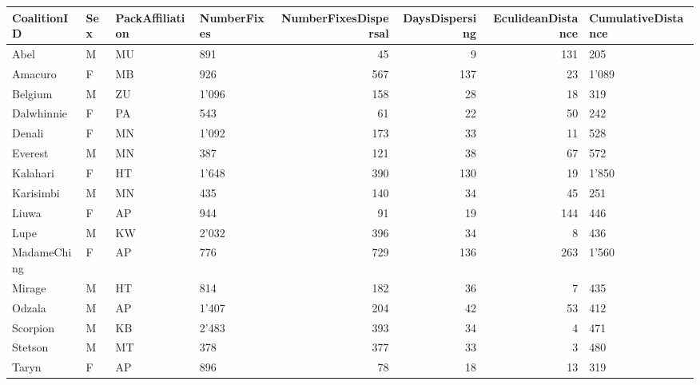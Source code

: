 \begin{tabular}{llllrrrl}
  \toprule
CoalitionID & Sex & PackAffiliation & NumberFixes & NumberFixesDispersal & DaysDispersing & EculideanDistance & CumulativeDistance \\ 
  \midrule
Abel & M & MU & 891 & 45 & 9 & 131 & 205 \\ 
  Amacuro & F & MB & 926 & 567 & 137 & 23 & 1'089 \\ 
  Belgium & M & ZU & 1'096 & 158 & 28 & 18 & 319 \\ 
  Dalwhinnie & F & PA & 543 & 61 & 22 & 50 & 242 \\ 
  Denali & F & MN & 1'092 & 173 & 33 & 11 & 528 \\ 
  Everest & M & MN & 387 & 121 & 38 & 67 & 572 \\ 
  Kalahari & F & HT & 1'648 & 390 & 130 & 19 & 1'850 \\ 
  Karisimbi & M & MN & 435 & 140 & 34 & 45 & 251 \\ 
  Liuwa & F & AP & 944 & 91 & 19 & 144 & 446 \\ 
  Lupe & M & KW & 2'032 & 396 & 34 & 8 & 436 \\ 
  MadameChing & F & AP & 776 & 729 & 136 & 263 & 1'560 \\ 
  Mirage & M & HT & 814 & 182 & 36 & 7 & 435 \\ 
  Odzala & M & AP & 1'407 & 204 & 42 & 53 & 412 \\ 
  Scorpion & M & KB & 2'483 & 393 & 34 & 4 & 471 \\ 
  Stetson & M & MT & 378 & 377 & 33 & 3 & 480 \\ 
  Taryn & F & AP & 896 & 78 & 18 & 13 & 319 \\ 
   \bottomrule
\end{tabular}
